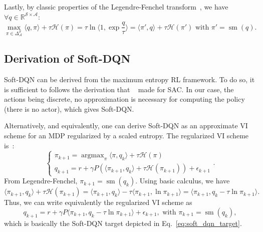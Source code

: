 \documentclass{article}
\newcommand{\h}{\mathcal{H}}
\DeclareMathOperator*{\argmax}{argmax}
\DeclareMathOperator*{\softmax}{sm}
\newcommand{\states}{\mathcal{S}}
\newcommand{\actions}{\mathcal{A}}
\begin{document}
Lastly, by classic properties of the Legendre-Fenchel transform~\cite{boyd2004convex,vieillard2020leverage}, we have  $\forall q\in\mathbb{R}^{\states\times\actions}$:
\begin{equation}
    \max_{\pi\in\Delta_\actions^\states} \langle q,\pi \rangle + \tau \h(\pi) = \tau \ln\langle 1, \exp \frac{q}{\tau}\rangle
    = \langle \pi', q\rangle + \tau \h(\pi') \text{ with } \pi' = \softmax(q).
\end{equation}


\subsection{Derivation of Soft-DQN}
\label{subappx:Soft-DQN}

Soft-DQN can be derived from the maximum entropy RL framework. To do so, it is sufficient to follows the derivation that ~\citet{haarnoja2018soft} made for SAC. In our case, the actions being discrete, no approximation is necessary for computing the policy (there is no actor), which gives Soft-DQN.

Alternatively, and equivalently, one can derive Soft-DQN as an approximate VI scheme for an MDP regularized by a scaled entropy. The regularized VI scheme is~\cite{geist2019theory,vieillard2020leverage}:
\begin{equation}
    \begin{cases}
        \pi_{k+1} = \argmax_\pi \langle \pi, q_k\rangle + \tau \h(\pi)
        \\
        q_{k+1} = r + \gamma P(\langle \pi_{k+1}, q_k \rangle + \tau \h(\pi_{k+1})) + \epsilon_{k+1}
    \end{cases}.
\end{equation}
From Legendre-Fenchel, $\pi_{k+1} = \softmax(q_k)$. Using basic calculus, we have
\begin{equation}
    \langle \pi_{k+1}, q_k \rangle + \tau \h(\pi_{k+1}) = \langle \pi_{k+1}, q_k \rangle - \tau \langle\pi_{k+1}, \ln\pi_{k+1}\rangle = \langle \pi_{k+1}, q_k - \tau \ln \pi_{k+1}\rangle. 
\end{equation}
Thus, we can write equivalently the regularized VI scheme as
\begin{equation}
    q_{k+1} = r + \gamma P \langle \pi_{k+1}, q_k - \tau \ln \pi_{k+1}\rangle + \epsilon_{k+1}, \text{ with } \pi_{k+1} = \softmax(q_k),
\end{equation}
which is basically the Soft-DQN target depicted in Eq.~\eqref{eq:soft_dqn_target}.
\end{document}
